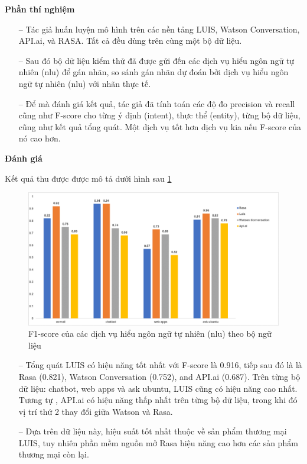 \textbf{Phần thí nghiệm}

\begin{itemize}
    \item[--] Tác giả huấn luyện mô hình trên các nền tảng LUIS, Watson Conversation, API.ai, và RASA. Tất cả đều dùng trên cùng một bộ dữ liệu.
        \item[--]Sau đó bộ dữ liệu kiểm thử đã được gửi đến các dịch vụ hiểu ngôn ngữ tự nhiên (\ac{nlu}) để gán nhãn, so sánh gán nhãn dự đoán bởi dịch vụ hiểu ngôn ngữ tự nhiên (\ac{nlu}) với nhãn thực tế.
        \item[--]Để mà đánh giá kết quả, tác giả đã tính toán các độ đo precision và recall cũng như F-score cho từng ý định (intent), thực thể (entity), từng bộ dữ liệu, cũng như kết quả tổng quát. Một dịch vụ tốt hơn dịch vụ kia nếu F-score của nó cao hơn.
\end{itemize}

\textbf{Đánh giá}

Kết quả thu được được mô tả dưới hình sau \ref{fig:comparisonimg-FscoresNLUServices}

\begin{figure}[H]
    \centering
    \includegraphics[width=15cm]{images/comparisonimg/FscoresNLUServices.png}
    \caption{F1-score của các dịch vụ hiểu ngôn ngữ tự nhiên (\ac{nlu}) theo bộ ngữ liệu}
    \label{fig:comparisonimg-FscoresNLUServices}
\end{figure}

\begin{itemize}
    \item[--] Tổng quát LUIS có hiệu năng tốt nhất với F-score là 0.916, tiếp sau đó là là Rasa (0.821), Watson Conversation (0.752), and API.ai (0.687). Trên từng bộ dữ liệu: chatbot, web apps và ask ubuntu, LUIS cũng có hiệu năng cao nhất. Tương tự , API.ai có hiệu năng thấp nhất trên từng bộ dữ liệu, trong khi đó vị trí thứ 2 thay đổi giữa Watson và Rasa.
    \item[--] Dựa trên dữ liệu này, hiệu suất tốt nhất thuộc về sản phẩm thương mại LUIS, tuy nhiên phần mềm nguồn mở Rasa hiệu năng cao hơn các sản phẩm thương mại còn lại.
\end{itemize}

